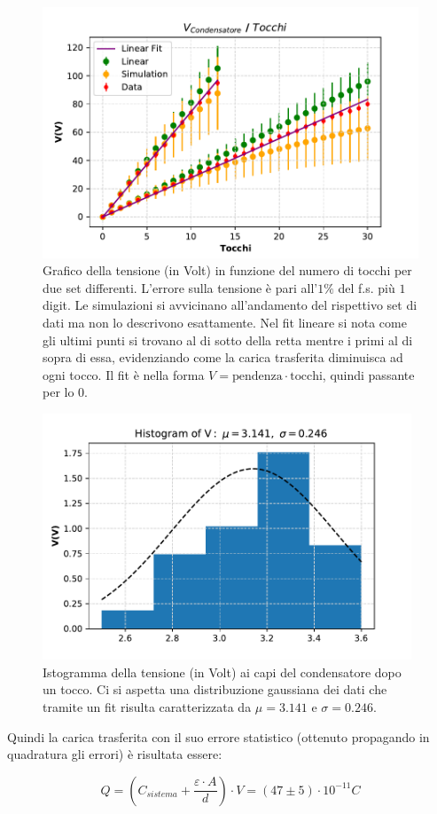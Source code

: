 {\fontsize{12}{14}\selectfont 

\begin{figure}[H]
  \centering
  \includegraphics[width=13cm]{Figures/Grafico_Parte2.pdf}
  \caption{Grafico della tensione (in Volt) in funzione del numero di tocchi per due set differenti. L'errore sulla tensione è pari all'$1\%$ del f.s. più $1$ digit. Le simulazioni si avvicinano all'andamento del rispettivo set di dati ma non lo descrivono esattamente. Nel fit lineare si nota come gli ultimi punti si trovano al di sotto della retta mentre i primi al di sopra di essa, evidenziando come la carica trasferita diminuisca ad ogni tocco. Il fit è nella forma $V = \text{pendenza} \cdot \text{tocchi}$, quindi passante per lo 0.}
  \label{fig:GraficoParteII}
\end{figure}

\begin{figure}[H]
  \centering
  \includegraphics[width=11cm]{Figures/Grafico_Parte2_Carica_Trasferita.pdf}
  \caption{Istogramma della tensione (in Volt) ai capi del condensatore dopo un tocco. Ci si aspetta una distribuzione gaussiana dei dati che tramite un fit risulta caratterizzata da $\mu = 3.141$ e $\sigma = 0.246$.}
  \label{fig:GraficoParteIICarica}
\end{figure}

Quindi la carica trasferita con il suo errore statistico (ottenuto propagando in quadratura gli errori) è risultata essere:

\begin{equation*}
    Q = \left(C_{sistema} + \dfrac{\varepsilon \cdot A}{d}\right) \cdot V = (47 \pm 5)\cdot 10^{-11} C
\end{equation*}



\par}